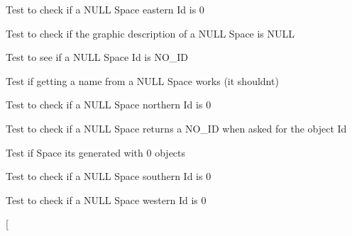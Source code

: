 \begin{DoxyRefList}
\item[\label{test__test000240}%
\hypertarget{test__test000240}{}%
Member \hyperlink{space__test_8h_a249293510e61c6d5465f52c14343d02b}{test2\+\_\+space\+\_\+get\+\_\+east} ()]Test to check if a N\+U\+LL Space eastern Id is 0  
\item[\label{test__test000244}%
\hypertarget{test__test000244}{}%
Member \hyperlink{space__test_8h_a392aef93729ff4dad9d0ced1bc3de780}{test2\+\_\+space\+\_\+get\+\_\+graphic\+\_\+description} ()]Test to check if the graphic description of a N\+U\+LL Space is N\+U\+LL  
\item[\label{test__test000234}%
\hypertarget{test__test000234}{}%
Member \hyperlink{space__test_8h_af9087176b0d3c41d83a17a4918b13e31}{test2\+\_\+space\+\_\+get\+\_\+id} ()]Test to see if a N\+U\+LL Space Id is N\+O\+\_\+\+ID  
\item[\label{test__test000232}%
\hypertarget{test__test000232}{}%
Member \hyperlink{space__test_8h_aee88ed31c63efc674051a4563aed86e2}{test2\+\_\+space\+\_\+get\+\_\+name} ()]Test if getting a name from a N\+U\+LL Space works (it shouldn\textquotesingle{}t)  
\item[\label{test__test000236}%
\hypertarget{test__test000236}{}%
Member \hyperlink{space__test_8h_a61891c9cebb9d26dc9f149ad8341517c}{test2\+\_\+space\+\_\+get\+\_\+north} ()]Test to check if a N\+U\+LL Space northern Id is 0  
\item[\label{test__test000248}%
\hypertarget{test__test000248}{}%
Member \hyperlink{space__test_8h_aeb550bccb20cc553cd7b26b433d74c4b}{test2\+\_\+space\+\_\+get\+\_\+object\+\_\+id} ()]Test to check if a N\+U\+LL Space returns a N\+O\+\_\+\+ID when asked for the object Id  
\item[\label{test__test000250}%
\hypertarget{test__test000250}{}%
Member \hyperlink{space__test_8h_a18daf22447654e3e69036e34f6b029a7}{test2\+\_\+space\+\_\+get\+\_\+objects\+\_\+number} ()]Test if Space its generated with 0 objects  
\item[\label{test__test000238}%
\hypertarget{test__test000238}{}%
Member \hyperlink{space__test_8h_a40fe07c07c1069023b362a9e506c4c59}{test2\+\_\+space\+\_\+get\+\_\+south} ()]Test to check if a N\+U\+LL Space southern Id is 0  
\item[\label{test__test000242}%
\hypertarget{test__test000242}{}%
Member \hyperlink{space__test_8h_af1cf02b01c007aec0684186b39666c32}{test2\+\_\+space\+\_\+get\+\_\+west} ()]Test to check if a N\+U\+LL Space western Id is 0  
\item[\label{test__test000256}%

\end{DoxyRefList}
